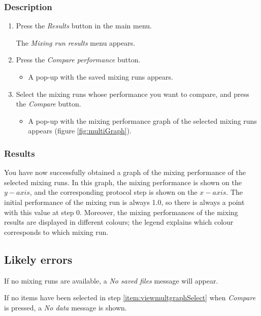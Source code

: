 \subsubsection{Description}\label{subsubsec:viewmultgraphDesc}
\begin{enumerate}
	\item Press the \emph{Results} button in the main menu.
		\begin{itemize}
            The \emph{Mixing run results} menu appears.
		\end{itemize}
	\item Press the \emph{Compare performance} button.
		\begin{itemize}
            \item A pop-up with the saved mixing runs appears.
		\end{itemize}
	\item Select the mixing runs whose performance you want to compare, and press the \emph{Compare} button.
		\begin{itemize}
            \item A pop-up with the mixing performance graph of the selected mixing runs appears (figure \ref{fig:multiGraph}).
		\end{itemize}
\end{enumerate}

\subsubsection{Results}
You have now successfully obtained a graph of the mixing performance of the selected mixing runs. In this graph, the mixing performance is shown on the $y-axis$, and the corresponding protocol step is shown on the $x-axis$. The initial performance of the mixing run is always 1.0, so there is always a point with this value at step 0. Moreover, the mixing performances of the mixing results are displayed in different colours; the legend explains which colour corresponds to which mixing run.

\subsection{Likely errors}
If no mixing runs are available, a \emph{No saved files} message will appear.

If no items have been selected in step \ref{item:viewmultgraphSelect} when \emph{Compare} is pressed, a \emph{No data} message is shown.


